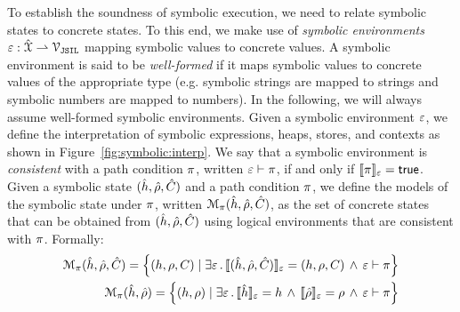  To establish the soundness of symbolic execution, we need to relate 
symbolic states to concrete states. To this end, we make use of \emph{symbolic environments} 
$\varepsilon : \hat{\mathcal{X}} \rightharpoonup \mathcal{V}_{\mathtt{JSIL}}$ mapping symbolic values to concrete values. 
A symbolic environment is said to be \emph{well-formed} if it maps symbolic 
values to concrete values of the appropriate type (e.g. symbolic strings are mapped to strings 
and symbolic numbers are mapped to numbers). In the following, we will always 
assume well-formed symbolic environments. 
%
Given a symbolic environment $\varepsilon$, we define the interpretation of symbolic 
expressions, heaps, stores, and contexts as shown in Figure~\ref{fig:symbolic:interp}. 
We say that a symbolic environment is \emph{consistent} with a path condition 
$\pi$, written $\varepsilon \vdash \pi$,  if and only if $\llbracket \pi \rrbracket_{\varepsilon} = {\sf true}$. 
Given a symbolic state $(\hat{h}, \hat\rho, \hat{C})$ and a path condition $\pi$, we define 
the models of the symbolic state under $\pi$, written $\mathcal{M}_{\pi}(\hat{h}, \hat\rho, \hat{C})$, 
as the set of concrete states that can be obtained from $(\hat{h}, \hat\rho, \hat{C})$ using 
logical environments that are consistent with $\pi$. Formally:
{\small \begin{align}
\mathcal{M}_{\pi}(\hat{h}, \hat\rho, \hat{C}) = \left\{ (h, \rho, C) \mid \exists \varepsilon \, . \,  \llbracket (\hat{h}, \hat\rho, \hat{C}) \rrbracket_{\varepsilon} = (h, \rho, C) \, \wedge \,  \varepsilon \vdash \pi  \right\} \\
\mathcal{M}_{\pi}(\hat{h}, \hat\rho) = \left\{ (h, \rho) \mid \exists \varepsilon \, . \,  \llbracket \hat{h} \rrbracket_{\varepsilon} = h \, \wedge \, \llbracket \hat\rho \rrbracket_{\varepsilon} = \rho \, \wedge \,  \varepsilon \vdash \pi  \right\}
\end{align}}


